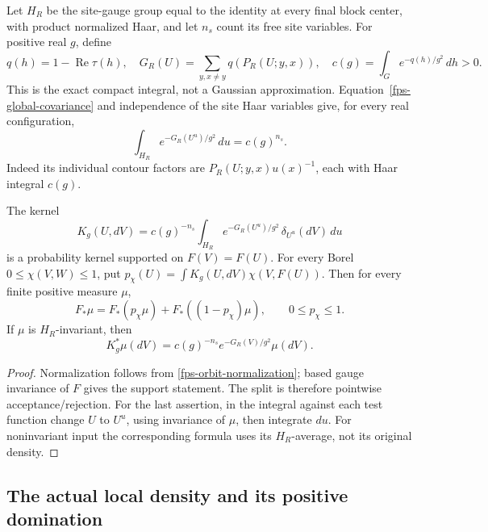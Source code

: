 Let \(H_R\) be the site-gauge group equal to the identity at every final
block center, with product normalized Haar, and let \(n_s\) count its
free site variables. For positive real \(g\), define
\begin{equation}
 q(h)=1-\operatorname{Re}\tau(h),\quad
 G_R(U)=\sum_{y,x\ne y}q(P_R(U;y,x)),\quad
 c(g)=\int_Ge^{-q(h)/g^2}\,dh>0.
 \label{fps-compact-normalizer}
\end{equation}
This is the exact compact integral, not a Gaussian approximation.
Equation~\eqref{fps-global-covariance} and independence of the site
Haar variables give, for every real configuration,
\begin{equation}
 \int_{H_R}e^{-G_R(U^u)/g^2}\,du=c(g)^{n_s}.
 \label{fps-orbit-normalization}
\end{equation}
Indeed its individual contour factors are
\(P_R(U;y,x)u(x)^{-1}\), each with Haar integral \(c(g)\).

\begin{lemma}
\label{fps-markov-lemma}
The kernel
\begin{equation}
 K_g(U,dV)=c(g)^{-n_s}\int_{H_R}
       e^{-G_R(U^u)/g^2}\,\delta_{U^u}(dV)\,du
 \label{fps-markov}
\end{equation}
is a probability kernel supported on \(F(V)=F(U)\).
For every Borel \(0\le\chi(V,W)\le1\), put
\(p_\chi(U)=\int K_g(U,dV)\chi(V,F(U))\). Then for every
finite positive measure \(\mu\),
\begin{equation}
 F_*\mu=F_*(p_\chi\mu)+F_*((1-p_\chi)\mu),\qquad
 0\le p_\chi\le1.
 \label{fps-markov-split}
\end{equation}
If \(\mu\) is \(H_R\)-invariant, then
\begin{equation}
 K_g^*\mu(dV)=c(g)^{-n_s}e^{-G_R(V)/g^2}\mu(dV).
 \label{fps-invariant-insertion}
\end{equation}
\end{lemma}
\begin{proof}
Normalization follows from \eqref{fps-orbit-normalization}; based gauge
invariance of \(F\) gives the support statement. The split is therefore
pointwise acceptance/rejection. For the last assertion, in the integral
against each test function change \(U\) to \(U^u\), using invariance of
\(\mu\), then integrate \(du\). For noninvariant input the corresponding
formula uses its \(H_R\)-average, not its original density.
\end{proof}

\subsection{The actual local density and its positive domination}
\label{fps-local-section}

